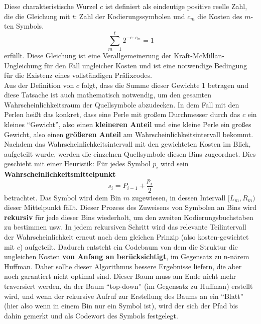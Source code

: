 \documentclass[a4paper,10pt,ngerman]{scrartcl}
\begin{document}
Diese charakteristische Wurzel $c$ ist definiert als eindeutige positive reelle Zahl, die die Gleichung mit $t$: Zahl der Kodierungssymbolen und $c_{m}$ die Kosten des $m$-ten Symbols. 
\begin{equation}
  \sum_{m=1}^{t}2^{-c \cdot c_{m}} = 1
  \label{eq:4}
\end{equation}
erfüllt. Diese Gleichung ist eine Verallgemeinerung der Kraft-McMillan-Ungleichung für den Fall ungleicher Kosten und ist eine notwendige Bedingung für die Existenz eines vollständigen Präfixcodes. \\
\newline
Aus der Definition von $c$ folgt, dass die Summe dieser Gewichte 1 betragen und diese Tatsache ist auch mathematisch notwendig, um den gesamten Wahrscheinlichkeitsraum der Quellsymbole abzudecken. In dem Fall mit den Perlen heißt das konkret, dass eine Perle mit großem Durchmesser durch das $c$ ein kleines “Gewicht”, also einen \textbf{kleineren Anteil} und eine kleine Perle ein großes Gewicht, also einen \textbf{größeren Anteil} am Wahrscheinlichkeitsintervall bekommt. \\
\newline
Nachdem das Wahrscheinlichkeitsintervall mit den gewichteten Kosten im Blick, aufgeteilt wurde, werden die einzelnen Quellsymbole diesen Bins zugeordnet. Dies geschieht mit einer Heuristik: Für jedes Symbol $p_i$ wird sein \textbf{Wahrscheinlichkeitsmittelpunkt} 
\begin{equation}
  s_i = P_{i - 1} + \frac{p_i}{2}
  \label{eq:5}
\end{equation}
betrachtet. Das Symbol wird dem Bin $m$ zugewiesen, in dessen Intervall $[L_m, R_m)$ dieser Mittelpunkt fällt. Dieser Prozess des Zuweisens von Symbolen an Bins wird \textbf{rekursiv} für jede dieser Bins wiederholt, um den zweiten Kodierungsbuchstaben zu bestimmen usw. In jedem rekursiven Schritt wird das relevante Teilintervall der Wahrscheinlichkeit erneut nach dem gleichen Prinzip (also kosten-gewichtet mit $c$) aufgeteilt. Dadurch entsteht ein Codebaum von dem die Struktur die ungleichen Kosten \textbf{von Anfang an berücksichtigt}, im Gegensatz zu n-närem Huffman. Daher sollte dieser Algorithmus bessere Ergebnisse liefern, die aber noch garantiert nicht optimal sind. Dieser Baum muss am Ende nicht mehr traversiert werden, da der Baum “top-down” (im Gegensatz zu Huffman) erstellt wird, und wenn der rekursive Aufruf zur Erstellung des Baums an ein “Blatt” (hier also wenn in einem Bin nur ein Symbol ist), wird der sich der Pfad bis dahin gemerkt und als Codewort des Symbols festgelegt. \\
\end{document}
